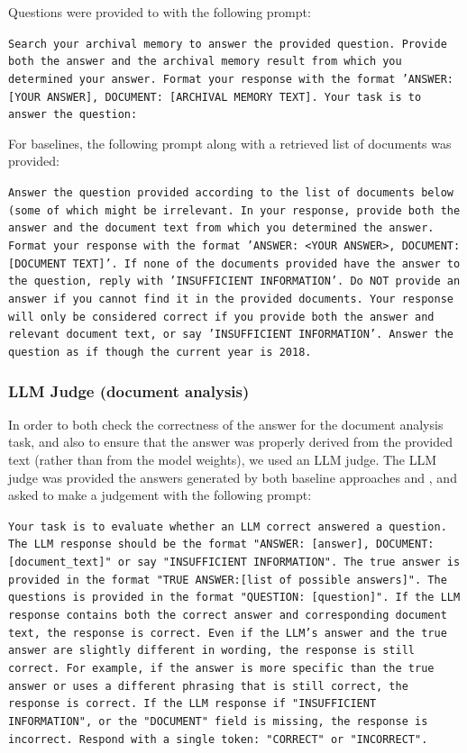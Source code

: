 Questions were provided to \ours with the following prompt:  
\begin{mdframed}
\small
\texttt{Search your archival memory to answer the provided question. Provide both the answer and the archival memory result from which you determined your answer. Format your response with the format 'ANSWER: [YOUR ANSWER], DOCUMENT: [ARCHIVAL MEMORY TEXT]. Your task is to answer the question:}
\end{mdframed}
For baselines, the following prompt along with a retrieved list of documents was provided: 
\begin{mdframed}
\small
\texttt{Answer the question provided according to the list of documents below (some of which might be irrelevant. In your response, provide both the answer and the document text from which you determined the answer. Format your response with the format 'ANSWER: <YOUR ANSWER>, DOCUMENT: [DOCUMENT TEXT]'. If none of the documents provided have the answer to the question, reply with 'INSUFFICIENT INFORMATION'. Do NOT provide an answer if you cannot find it in the provided documents. Your response will only be considered correct if you provide both the answer and relevant document text, or say 'INSUFFICIENT INFORMATION'. Answer the question as if though the current year is 2018.}
\end{mdframed}

\subsubsection{LLM Judge (document analysis)}
In order to both check the correctness of the answer for the document analysis task, and also to ensure that the answer was properly derived from the provided text (rather than from the model weights), we used an LLM judge. The LLM judge was provided the answers generated by both baseline approaches and \ours, and asked to make a judgement with the following prompt: 
\begin{mdframed}
\small
\texttt{Your task is to evaluate whether an LLM correct answered a question. The LLM response should be the format "ANSWER: [answer], DOCUMENT: [document\_text]" or say "INSUFFICIENT INFORMATION". The true answer is provided in the format "TRUE ANSWER:[list of possible answers]". The questions is provided in the format "QUESTION: [question]". If the LLM response contains both the correct answer and corresponding document text, the response is correct. Even if the LLM's answer and the true answer are slightly different in wording, the response is still correct. For example, if the answer is more specific than the true answer or uses a different phrasing that is still correct, the response is correct. If the LLM response if "INSUFFICIENT INFORMATION", or the "DOCUMENT" field is missing, the response is incorrect. Respond with a single token: "CORRECT" or "INCORRECT".}
\end{mdframed}

